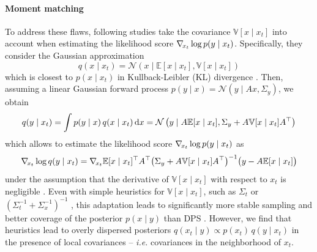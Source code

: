 \paragraph{Moment matching} To address these flaws, following studies \cite{song2023pseudoinverseguided, rozet2023scorebased, finzi2023userdefined, boys2023tweedie} take the covariance $\mathbb{V}[x \mid x_t]$ into account when estimating the likelihood score $\nabla_{\!{x_t}} \log p(y \mid x_t)$. Specifically, they consider the Gaussian approximation
\begin{equation} \label{eq:diem-p_x_xt}
    q(x \mid x_t) = \mathcal{N} \left(x \mid \mathbb{E}[x \mid x_t], \mathbb{V}[x \mid x_t] \right)
\end{equation}
which is closest to $p(x \mid x_t)$ in Kullback-Leibler (KL) divergence \cite{bishop2006pattern}. Then, assuming a linear Gaussian forward process $p(y \mid x) = \mathcal{N}(y \mid A x, \Sigma_y)$, we obtain \cite{bishop2006pattern}
\begin{align} \label{eq:diem-p_y_xt}
    q(y \mid x_t) = \int p(y \mid x) \, q(x \mid x_t) \operatorname{d}\!{x} = \mathcal{N} \left(y \mid A \mathbb{E}[x \mid x_t], \Sigma_y + A \mathbb{V}[x \mid x_t] A^\top \right)
\end{align}
which allows to estimate the likelihood score $\nabla_{\!{x_t}} \log p(y \mid x_t)$ as
\begin{equation} \label{eq:diem-likelihood-score}
    \nabla_{\!{x_t}} \log q(y \mid x_t) = \nabla_{\!{x_t}} \mathbb{E}[x \mid x_t]^\top A^\top \big(\Sigma_y + A \mathbb{V}[x \mid x_t] A^\top\big)^{-1} \big(y - A \mathbb{E}[x \mid x_t]\big)
\end{equation}
under the assumption that the derivative of $\mathbb{V}[x \mid x_t]$ with respect to $x_t$ is negligible \cite{finzi2023userdefined, boys2023tweedie}. Even with simple heuristics for $\mathbb{V}[x \mid x_t]$, such as $\Sigma_t$ \cite{adam2022posterior} or $(\Sigma_t^{-1} + \Sigma_x^{-1})^{-1}$ \cite{song2023pseudoinverseguided, rozet2023scorebased}, this adaptation leads to significantly more stable sampling and better coverage of the posterior $p(x \mid y)$ than DPS \cite{chung2023diffusion}. However, we find that heuristics lead to overly dispersed posteriors $q(x_t \mid y) \propto p(x_t) \, q(y \mid x_t)$ in the presence of local covariances -- \emph{i.e.} covariances in the neighborhood of $x_t$.

